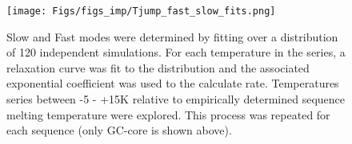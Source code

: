 \documentclass[journal=jpcbfk,manuscript=article]{achemso}
\begin{document}
\begin{figure}[ht!]
	\begin{center}
        \texttt{[image: Figs/figs\_imp/Tjump\_fast\_slow\_fits.png]}
        \caption{Slow and Fast modes were determined by fitting over a distribution of 120 independent simulations. For each temperature in the series, a relaxation curve was fit to the distribution and the associated exponential coefficient was used to the calculate rate. Temperatures series between -5 - +15K relative to empirically determined sequence melting temperature were explored. This process was repeated for each sequence (only GC-core is shown above).}
        \label{fig:fast_slow_fits}
	\end{center}
\end{figure}
\end{document}
